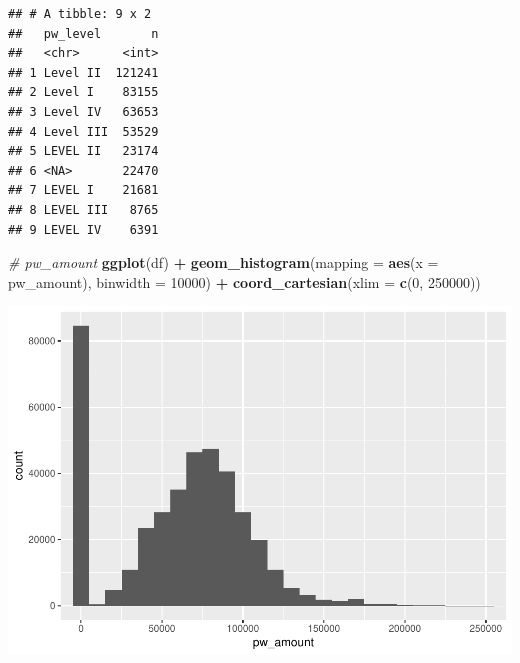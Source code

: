 \documentclass[]{article}
\newenvironment{Shaded}{\begin{snugshade}}{\end{snugshade}}
\newcommand{\KeywordTok}[1]{\textcolor[rgb]{0.13,0.29,0.53}{\textbf{#1}}}
\newcommand{\DataTypeTok}[1]{\textcolor[rgb]{0.13,0.29,0.53}{#1}}
\newcommand{\DecValTok}[1]{\textcolor[rgb]{0.00,0.00,0.81}{#1}}
\newcommand{\StringTok}[1]{\textcolor[rgb]{0.31,0.60,0.02}{#1}}
\newcommand{\CommentTok}[1]{\textcolor[rgb]{0.56,0.35,0.01}{\textit{#1}}}
\newcommand{\OperatorTok}[1]{\textcolor[rgb]{0.81,0.36,0.00}{\textbf{#1}}}
\newcommand{\NormalTok}[1]{#1}
\begin{document}
\begin{Shaded}
\end{Shaded}

\begin{verbatim}
## # A tibble: 9 x 2
##   pw_level       n
##   <chr>      <int>
## 1 Level II  121241
## 2 Level I    83155
## 3 Level IV   63653
## 4 Level III  53529
## 5 LEVEL II   23174
## 6 <NA>       22470
## 7 LEVEL I    21681
## 8 LEVEL III   8765
## 9 LEVEL IV    6391
\end{verbatim}

\begin{Shaded}
\begin{Highlighting}[]
\CommentTok{# pw_amount}
\KeywordTok{ggplot}\NormalTok{(df) }\OperatorTok{+}
\StringTok{  }\KeywordTok{geom_histogram}\NormalTok{(}\DataTypeTok{mapping =} \KeywordTok{aes}\NormalTok{(}\DataTypeTok{x =}\NormalTok{ pw_amount), }\DataTypeTok{binwidth =} \DecValTok{10000}\NormalTok{) }\OperatorTok{+}
\StringTok{  }\KeywordTok{coord_cartesian}\NormalTok{(}\DataTypeTok{xlim =} \KeywordTok{c}\NormalTok{(}\DecValTok{0}\NormalTok{, }\DecValTok{250000}\NormalTok{))}
\end{Highlighting}
\end{Shaded}

\includegraphics{Report_Dummy_files/figure-latex/variable-specific exploratory data analysis-2.pdf}

\begin{Shaded}
\end{Shaded}
\end{document}
